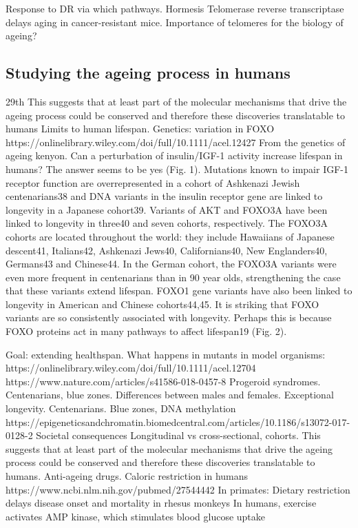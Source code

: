 Response to DR via which pathways.
Hormesis
Telomerase reverse transcriptase delays aging in cancer-resistant mice. Importance of telomeres for the biology of ageing?

\subsection{Studying the ageing process in humans}

29th
This suggests that at least part of the molecular mechanisms that drive the ageing process could be conserved and therefore these discoveries translatable to humans
Limits to human lifespan.
Genetics: variation in FOXO 
https://onlinelibrary.wiley.com/doi/full/10.1111/acel.12427
From the genetics of ageing kenyon. Can a perturbation of insulin/IGF-1 activity increase lifespan in humans? The answer seems to be yes (Fig. 1). Mutations known to impair IGF-1 receptor function are overrepresented in a cohort of Ashkenazi Jewish centenarians38 and DNA variants in the insulin receptor gene are linked to longevity in a Japanese cohort39. Variants of AKT and FOXO3A have been linked to longevity in three40 and seven cohorts, respectively. The FOXO3A cohorts are located throughout the world: they include Hawaiians of Japanese descent41, Italians42, Ashkenazi Jews40, Californians40, New Englanders40, Germans43 and Chinese44. In the German cohort, the FOXO3A variants were even more frequent in centenarians than in 90 year olds, strengthening the case that these variants extend lifespan. FOXO1 gene variants have also been linked to longevity in American and Chinese cohorts44,45. It is striking that FOXO variants are so consistently associated with longevity. Perhaps this is because FOXO proteins act in many pathways to affect lifespan19 (Fig. 2).

Goal: extending healthspan. What happens in mutants in model organisms:
https://onlinelibrary.wiley.com/doi/full/10.1111/acel.12704
https://www.nature.com/articles/s41586-018-0457-8
Progeroid syndromes.
Centenarians, blue zones.
Differences between males and females.
Exceptional longevity. Centenarians. Blue zones, DNA methylation
https://epigeneticsandchromatin.biomedcentral.com/articles/10.1186/s13072-017-0128-2
Societal consequences
Longitudinal vs cross-sectional, cohorts.
This suggests that at least part of the molecular mechanisms that drive the ageing process could be conserved and therefore these discoveries translatable to humans. Anti-ageing drugs.
Caloric restriction in humans
https://www.ncbi.nlm.nih.gov/pubmed/27544442
In primates: Dietary restriction delays disease onset and mortality in rhesus monkeys
 In humans, exercise activates AMP kinase, which stimulates blood glucose uptake



